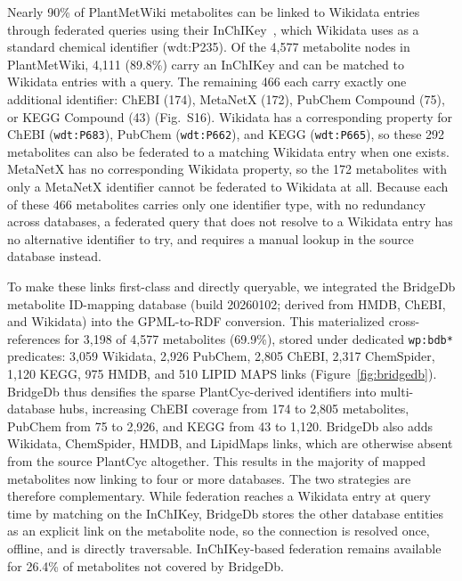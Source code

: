 \documentclass[11pt,a4paper]{article}
\begin{document}
Nearly 90\% of PlantMetWiki metabolites can be linked to Wikidata entries through federated queries using
their InChIKey~\cite{heller2015}, which Wikidata uses as a standard chemical identifier (wdt:P235). Of the 4,577
metabolite nodes in PlantMetWiki, 4,111 (89.8\%) carry an InChIKey and can be matched to Wikidata entries
with a query. The remaining 466 each carry exactly one additional identifier: ChEBI (174), MetaNetX
(172), PubChem Compound (75), or KEGG Compound (43) (Fig.~S16). Wikidata has a corresponding property
for ChEBI (\texttt{wdt:P683}), PubChem (\texttt{wdt:P662}), and KEGG (\texttt{wdt:P665}), so these 292
metabolites can also be federated to a matching Wikidata entry when one exists. MetaNetX has no
corresponding Wikidata property, so the 172 metabolites with only a MetaNetX identifier cannot be
federated to Wikidata at all. Because each of these 466 metabolites carries only one identifier type,
with no redundancy across databases, a federated query that does not resolve to a Wikidata entry has no
alternative identifier to try, and requires a manual lookup in the source database instead.

To make these links first-class and directly queryable, we integrated the BridgeDb metabolite
ID-mapping database (build 20260102; derived from HMDB, ChEBI, and Wikidata) into the GPML-to-RDF
conversion. This materialized cross-references for 3,198 of 4,577 metabolites (69.9\%), stored under
dedicated \texttt{wp:bdb*} predicates: 3,059 Wikidata, 2,926 PubChem, 2,805 ChEBI, 2,317 ChemSpider,
1,120 KEGG, 975 HMDB, and 510 LIPID MAPS links  (Figure~\ref{fig:bridgedb}). BridgeDb thus densifies the
sparse PlantCyc-derived identifiers into multi-database hubs, increasing ChEBI coverage from 174 to 2,805
metabolites, PubChem from 75 to 2,926, and KEGG from 43 to 1,120. BridgeDb also adds Wikidata,
ChemSpider, HMDB, and LipidMaps links, which are otherwise absent from the source PlantCyc altogether.
This results in the majority of mapped metabolites now linking to four or more databases. The two
strategies are therefore complementary. While federation reaches a Wikidata entry at query time by
matching on the InChIKey, BridgeDb stores the other database entities as an explicit link on the
metabolite node, so the connection is resolved once, offline, and is directly traversable.
InChIKey-based federation remains available for 26.4\% of metabolites not covered by BridgeDb.
\end{document}
